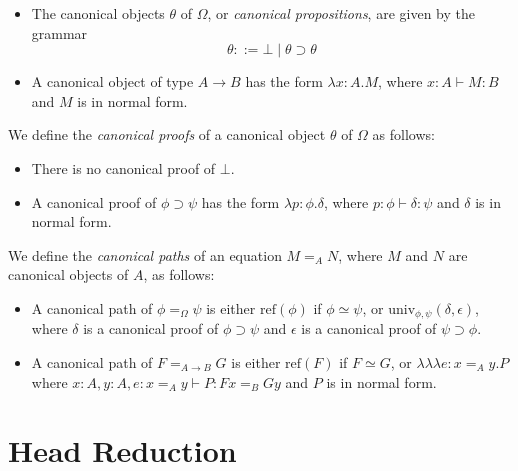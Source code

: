 \documentclass[a4paper,UKenglish]{lipics-v2016}
\newcommand*{\reff}[1]{\ensuremath{\mathrm{ref} \left( {#1} \right)}}
\newcommand*{\univ}[4]{\ensuremath{\mathrm{univ}_{{#1}, {#2}} \left({#3} , {#4} \right)}}
\newcommand*{\triplelambda}{\ensuremath{\lambda \!\! \lambda \!\! \lambda}}
\theoremstyle{plain}
\begin{document}
\begin{definition}
$ $
\begin{itemize}
\item
The canonical objects $\theta$ of $\Omega$, or \emph{canonical propositions}, are given by the grammar
\[ \theta ::= \bot \mid \theta \supset \theta \]
\item
A canonical object of type $A \rightarrow B$ has the form $\lambda x:A.M$, where
$x : A \vdash M : B$ and $M$ is in normal form.
\end{itemize}
We define the \emph{canonical proofs} of a canonical object $\theta$ of $\Omega$ as follows:
\begin{itemize}
\item
There is no canonical proof of $\bot$.
\item
A canonical proof of $\phi \supset \psi$ has the form $\lambda p : \phi . \delta$, where $p : \phi \vdash \delta : \psi$ and $\delta$ is in normal form.
\end{itemize}
We define the \emph{canonical paths} of an equation $M =_A N$, where $M$ and $N$ are canonical objects of $A$, as follows:
\begin{itemize}
\item
A canonical path of $\phi =_\Omega \psi$ is either $\reff{\phi}$ if $\phi \simeq \psi$, or $\univ{\phi}{\psi}{\delta}{\epsilon}$, where $\delta$ is a canonical
proof of $\phi \supset \psi$ and $\epsilon$ is a canonical proof of $\psi \supset \phi$.
\item
A canonical path of $F =_{A \rightarrow B} G$ is either $\reff{F}$ if $F \simeq G$, or $\triplelambda e:x =_A y.P$ where $x : A, y : A, e : x =_A y \vdash P : Fx =_B Gy$ and $P$ is in normal form.
\end{itemize}
\end{definition}

\section{Head Reduction}
\end{document}
